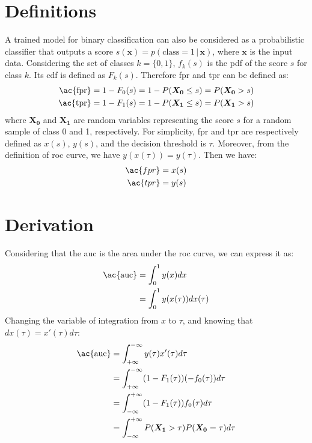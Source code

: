\begin{appendices}
\section{Definitions}
A trained model for binary classification can also be considered as a probabilistic 
classifier that outputs a score $s(\boldsymbol{x}) = p(\text{class}=1\,|\,\boldsymbol{x})$,
where $\boldsymbol{x}$ is the input data.
Considering the set of classes $k = \{0, 1\}$, $f_k(s)$ is the \ac{pdf} of the 
score $s$ for class $k$. Its \ac{cdf} is defined as $F_k(s)$.
Therefore \ac{fpr} and \ac{tpr} can be defined as:
\begin{align*}
    \text{\ac{fpr}} &= 1 - F_0(s) = 1 - P(\boldsymbol{X_0} \leq s) = P(\boldsymbol{X_0} > s)\\
    \text{\ac{tpr}} &= 1 - F_1(s) = 1 - P(\boldsymbol{X_1} \leq s) = P(\boldsymbol{X_1} > s)
\end{align*}
where $\boldsymbol{X_0}$ and $\boldsymbol{X_1}$ are random variables representing 
the score $s$ for a random sample of class 0 and 1, respectively.
For simplicity, \ac{fpr} and \ac{tpr} are respectively defined as $x(s)$, $y(s)$,
and the decision threshold is $\tau$. Moreover, from the definition of \ac{roc} curve,
we have $y(x(\tau)) = y(\tau)$.
 Then we have:
\begin{align*}
    \ac{fpr} &= x(s) \\
    \ac{tpr} &= y(s)
\end{align*}

\section{Derivation}
Considering that the \ac{auc} is the area under the \ac{roc} curve, we can express 
it as:
\begin{align}
    \text{\ac{auc}} &= \int_{0}^{1} y(x)dx \nonumber\\
    &= \int_{0}^{1} y(x(\tau))dx(\tau) \nonumber
\end{align}
Changing the variable of integration from $x$ to $\tau$, and knowing that 
$dx(\tau) = x'(\tau)d\tau$:
\begin{align}
    \text{\ac{auc}} &= \int_{+\infty}^{-\infty} y(\tau)x'(\tau)d\tau \nonumber\\
    &= \int_{+\infty}^{-\infty} (1-F_1(\tau)) (-f_0(\tau)) d\tau \nonumber \\
    &= \int_{-\infty}^{+\infty} (1 - F_1(\tau))f_0(\tau) d\tau 
    \label{eq:auc1}\\
    &= \int_{-\infty}^{+\infty} P(\boldsymbol{X_1} > \tau) P(\boldsymbol{X_0} = \tau) d\tau
    \label{eq:auc2}
\end{align}


\end{appendices}
